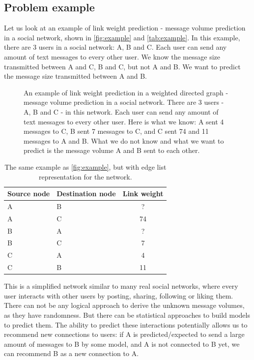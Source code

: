 \documentclass[conference]{IEEEtran}
\begin{document}
\subsection{Problem example}
Let us look at an example of link weight prediction - message volume prediction in a social network, shown in \autoref{fig:example} and \autoref{tab:example}.
In this example, there are 3 users in a social network: A, B and C.
Each user can send any amount of text messages to every other user.
We know the message size transmitted between A and C, B and C, but not A and B.
We want to predict the message size transmitted between A and B.
\begin{figure}[!htb]\centering
	\caption{
		An example of link weight prediction in a weighted directed graph -
		message volume prediction in a social network.
		There are 3 users - A, B and C - in this network.
		Each user can send any amount of text messages to every other user.
		Here is what we know:
		A sent 4 messages to C,
		B sent 7 messages to C,
		and C sent 74 and 11 messages to A and B.
		What we do not know and what we want to predict is
		the message volume A and B sent to each other.
		}
	\label{fig:example}
\end{figure}
\begin{table}[!htb]\centering
	\caption{
		The same example as \autoref{fig:example}, but with edge list representation for the network.
	}
	\begin{tabularx}{0.45\textwidth}{|X|X|c|}  \hline \rowcolor{blue!40}
		Source node & Destination node & Link weight \\ \hline
		A & B & ? \\ \hline
		A & C & 74 \\ \hline
		B & A & ? \\ \hline
		B & C & 7 \\ \hline
		C & A & 4 \\ \hline
		C & B & 11 \\ \hline
	\end{tabularx}
	\label{tab:example}
\end{table}
This is a simplified network similar to many real social networks, where every user interacts with other users by posting, sharing, following or liking them.
There can not be any logical approach to derive the unknown message volumes,
as they have randomness.
But there can be statistical approaches to build models to predict them.
The ability to predict these interactions potentially allows us to recommend new connections to users:
if A is predicted/expected to send a large amount of messages to B by some model,
and A is not connected to B yet,
we can recommend B as a new connection to A.
\end{document}
